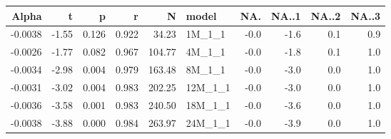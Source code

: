 \begin{table}[ht]
\centering
\begin{tabular}{rrrrrlrrrr}
  \hline
Alpha & t & p & r & N & model & NA. & NA..1 & NA..2 & NA..3 \\ 
  \hline
-0.0038 & -1.55 & 0.126 & 0.922 & 34.23 & 1M\_1\_1 & -0.0 & -1.6 & 0.1 & 0.9 \\ 
  -0.0026 & -1.77 & 0.082 & 0.967 & 104.77 & 4M\_1\_1 & -0.0 & -1.8 & 0.1 & 1.0 \\ 
  -0.0034 & -2.98 & 0.004 & 0.979 & 163.48 & 8M\_1\_1 & -0.0 & -3.0 & 0.0 & 1.0 \\ 
  -0.0031 & -3.02 & 0.004 & 0.983 & 202.25 & 12M\_1\_1 & -0.0 & -3.0 & 0.0 & 1.0 \\ 
  -0.0036 & -3.58 & 0.001 & 0.983 & 240.50 & 18M\_1\_1 & -0.0 & -3.6 & 0.0 & 1.0 \\ 
  -0.0038 & -3.88 & 0.000 & 0.984 & 263.97 & 24M\_1\_1 & -0.0 & -3.9 & 0.0 & 1.0 \\ 
   \hline
\end{tabular}
\end{table}

